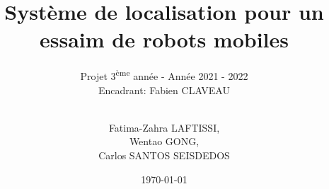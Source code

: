 \documentclass{article} %
\author{\\Fatima-Zahra LAFTISSI, \\ Wentao GONG, \\ Carlos SANTOS SEISDEDOS}
\date{\today}
\title{Système de localisation pour un essaim de robots mobiles}
\subtitle{Projet 3\textsuperscript{ème} année - Année 2021 - 2022 \\
\large{Encadrant: Fabien CLAVEAU}}
\begin{document}
\imtaMaketitlepage


\tableofcontents



%
%


{}


\imtaMakeCover
\end{document}
